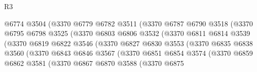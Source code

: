 \begin{lexlean}{R3}
\begin{coremodule}
                                @6774
                                @3504
                                (@3370
                                  @6779
                                  @6782
                                  @3511
                                  (@3370
                                    @6787
                                    @6790
                                    @3518
                                    (@3370
                                      @6795
                                      @6798
                                      @3525
                                      (@3370
                                        @6803
                                        @6806
                                        @3532
                                        (@3370
                                          @6811
                                          @6814
                                          @3539
                                          (@3370
                                            @6819
                                            @6822
                                            @3546
                                            (@3370
                                              @6827
                                              @6830
                                              @3553
                                              (@3370
                                                @6835
                                                @6838
                                                @3560
                                                (@3370
                                                  @6843
                                                  @6846
                                                  @3567
                                                  (@3370
                                                    @6851
                                                    @6854
                                                    @3574
                                                    (@3370
                                                      @6859
                                                      @6862
                                                      @3581
                                                      (@3370
                                                        @6867
                                                        @6870
                                                        @3588
                                                        (@3370
                                                          @6875

\end{coremodule}
\end{lexlean}
